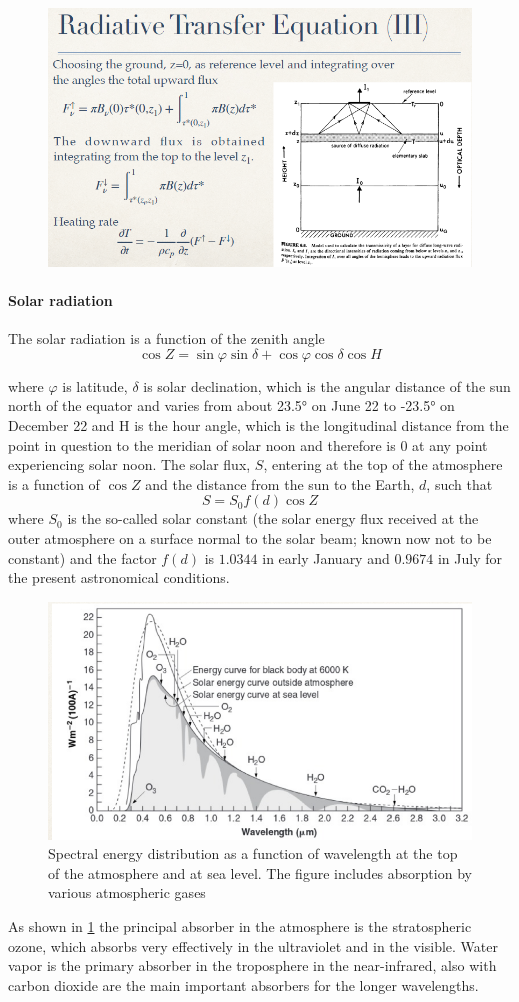 \begin{figure}[htpb]
	\centering
	\includegraphics[width=0.5\linewidth]{upload/18image.png}
\end{figure}

\paragraph{Solar radiation} The solar radiation is a function of the zenith angle
$$\cos Z = \sin \varphi \sin \delta + \cos \varphi \cos \delta \cos H$$

where $\varphi$ is latitude, $\delta$ is solar declination, which is the angular distance of the sun north of the equator and varies from about 23.5° on June 22 to -23.5° on December 22 and H is the hour angle, which is the longitudinal distance from the point in question to the meridian of solar noon and therefore is 0 at any point experiencing solar noon.
The solar flux, $S$, entering at the top of the atmosphere is a function of $\cos Z$ and the distance from the sun to the Earth, $d$, such that
$$S = S_0 f(d) \cos Z$$
where $S_{0}$ is the so-called solar constant (the solar energy flux received at the outer atmosphere on a surface normal to the solar beam; known now not to be constant) and the factor $f(d)$ is $1.0344$ in early January and $0.9674$ in July for the present astronomical conditions.
\begin{figure}[htp!]
	\centering
	\includegraphics[width=0.5\linewidth]{upload/image12.png}
	\caption{Spectral energy distribution as a function of wavelength at the top of the atmosphere and at sea level. The figure includes absorption by various atmospheric gases}
	\label{fig1}

\end{figure}
As shown in \ref{fig1} the principal absorber in the atmosphere is the stratospheric ozone, which absorbs very effectively in the ultraviolet and in the visible. Water vapor is the primary absorber in the troposphere in the near-infrared, also with carbon dioxide are the main important absorbers for the longer wavelengths.

